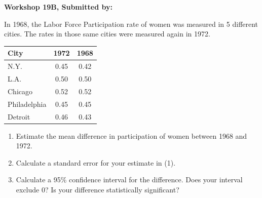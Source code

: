 \documentclass[11pt, chapterprefix=true]{scrbook}\usepackage[]{graphicx}\usepackage[]{color}
\begin{document}
\begin{exercises}
\begin{solution}
\end{solution}

\clearpage

    \begin{exercise}  %

    \begin{center}
\begin{flushleft}\textbf{\large \hfill Workshop 19B, Submitted by: }\end{flushleft}

\end{center}

In 1968, the Labor Force Participation rate of women was measured in 5 different cities.  The rates in those same cities were measured again in 1972.

\begin{center}
\begin{tabular}{@{} lcc @{}} \hline
City&	1972&	1968 \\ \hline
N.Y.&	0.45&	0.42 \\
L.A.&	0.50&	0.50 \\
Chicago&	0.52&	0.52 \\
Philadelphia&	0.45&	0.45 \\
Detroit&	0.46&	0.43 \\ \hline
\end{tabular}
\end{center} 

\begin{enumerate}
  \item Estimate the mean difference in participation of women between 1968 and 1972.  
  \item	Calculate a standard error for your estimate in (1).
  \item	Calculate a 95\% confidence interval for the difference.  Does your interval exclude 0?  Is your difference statistically significant?
\end{enumerate}


\end{exercise}
\end{exercises}
\end{document}
